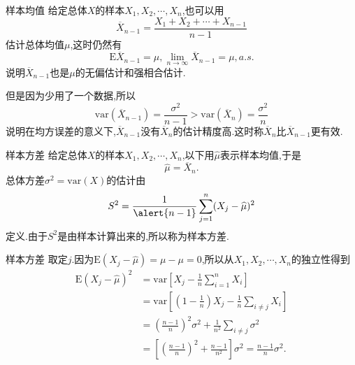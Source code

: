 	\begin{frame}{样本均值}
		给定总体$X$的样本$X_1,X_2,\cdots,X_n$,也可以用
		\begin{equation}
			\overline{X}_{n-1} = \frac{X_1+X_2+\cdots+X_{n-1}}{n-1}
		\end{equation}
		估计总体均值$\mu$,这时仍然有
		\begin{equation}
			\mathrm{E}\overline{X}_{n-1} = \mu,\lim\limits_{n\to\infty}\overline{X}_{n-1} = \mu,a.s.
		\end{equation}
		说明$\overline{X}_{n-1}$也是$\mu$的无偏估计和强相合估计.
		
		但是因为少用了一个数据,所以
		\begin{equation}
			\mathrm{var}(\overline{X}_{n-1}) = \frac{\sigma^2}{n-1} >\mathrm{var}(\overline{X}_{n}) = \frac{\sigma^2}{n}
		\end{equation}
		说明在均方误差的意义下,$\overline{X}_{n-1}$没有$\overline{X}_{n}$的估计精度高.这时称$\overline{X}_{n}$比$\overline{X}_{n-1}$\alert{更有效}.
	\end{frame}
	
	\begin{frame}{样本方差}
		给定总体$X$的样本$X_1,X_2,\cdots,X_n$,以下用$\widehat{\mu}$表示样本均值,于是
		\begin{equation}
			\widehat{\mu} = \overline{X}_n.
		\end{equation}
		总体方差$\sigma^2 = \mathrm{var}(X)$的估计由
		\begin{equation}
			S^2 = \frac{1}{\alert{n-1}}\sum_{j=1}^{n}(X_j-\widehat{\mu})^2
		\end{equation}
		定义.由于$S^2$是由样本计算出来的,所以称为样本方差.
	\end{frame}		

	\begin{frame}{样本方差}
		取定$j$.因为$\mathrm{E}(X_j-\widehat{\mu}) = \mu - \mu = 0$,所以从$X_1,X_2,\cdots,X_n$的独立性得到
		\begin{equation}
			\begin{split}
				\mathrm{E}(X_j-\widehat{\mu})^2 &= \mathrm{var}\left[X_j - \frac{1}{n}\sum_{i=1}^{n}X_i \right] \\
				&= \mathrm{var}\left[(1-\frac{1}{n})X_j -\frac{1}{n}\sum_{i\neq j}X_i \right] \\
				&= \left(\frac{n-1}{n}\right)^2\sigma^2 + \frac{1}{n^2}\sum_{i\neq j}\sigma^2 \\
				&= \left[\left(\frac{n-1}{n}\right)^2 + \frac{n-1}{n^2} \right]\sigma^2 = \frac{n-1}{n}\sigma^2.
			\end{split}
		\end{equation}

	\end{frame}	

